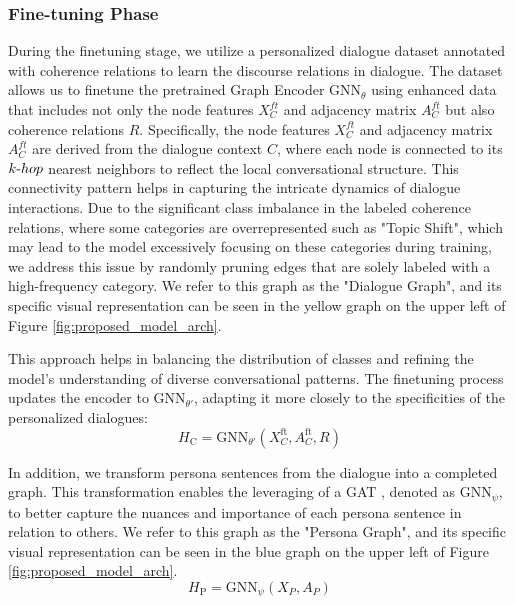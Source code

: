 \subsubsection{Fine-tuning Phase}
During the finetuning stage, we utilize a personalized dialogue dataset annotated with coherence relations to learn the discourse relations in dialogue. The dataset allows us to finetune the pretrained Graph Encoder $\text{GNN}_{\theta}$ using enhanced data that includes not only the node features $X_{C}^{ft}$ and adjacency matrix $A_{C}^{ft}$ but also coherence relations $R$. Specifically, the node features $X_{C}^{ft}$ and adjacency matrix $A_{C}^{ft}$ are derived from the dialogue context $C$, where each node is connected to its $k{\text -}hop$ nearest neighbors to reflect the local conversational structure. This connectivity pattern helps in capturing the intricate dynamics of dialogue interactions. Due to the significant class imbalance in the labeled coherence relations, where some categories are overrepresented such as "Topic Shift", which may lead to the model excessively focusing on these categories during training, we address this issue by randomly pruning edges that are solely labeled with a high-frequency category. We refer to this graph as the "Dialogue Graph", and its specific visual representation can be seen in the yellow graph on the upper left of Figure \ref{fig:proposed_model_arch}.

This approach helps in balancing the distribution of classes and refining the model's understanding of diverse conversational patterns. The finetuning process updates the encoder to $\text{GNN}_{\theta'}$, adapting it more closely to the specificities of the personalized dialogues:
\begin{equation}\label{eq:gnn_ft_enc}
    H_{\text{C}} = \text{GNN}_{\theta'}(X_{C}^{\text{ft}}, A_{C}^{\text{ft}}, R)
\end{equation}

In addition, we transform persona sentences from the dialogue into a completed graph. This transformation enables the leveraging of a GAT \cite{brody-etal-2022-gatv2}, denoted as $\text{GNN}_{\psi}$, to better capture the nuances and importance of each persona sentence in relation to others. We refer to this graph as the "Persona Graph", and its specific visual representation can be seen in the blue graph on the upper left of Figure \ref{fig:proposed_model_arch}.
\begin{equation}
H_{\text{P}} = \text{GNN}_{\psi}(X_{P}, A_{P})
\end{equation}


